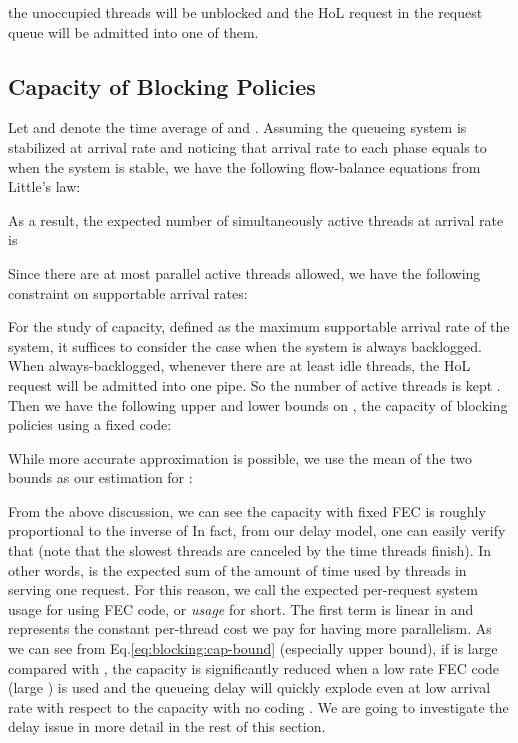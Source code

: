 \documentclass[journal]{IEEEtran}
\begin{document}
the unoccupied threads will be unblocked and the HoL request in the request queue will be admitted into one of them.


  

\subsection{Capacity of Blocking Policies}
\label{ssec:capBlocking}
Let  and  denote the time average of   and . 
Assuming the queueing system is stabilized at arrival rate  and noticing that arrival rate to each phase equals to  when the system is stable, we have the following flow-balance equations from Little's law:

As a result, the expected number of simultaneously active threads at arrival rate  is

Since there are at most  parallel active threads allowed, we have the following constraint on supportable arrival rates:


For the study of  capacity, 
defined as the maximum supportable arrival rate  of the system, it suffices to consider the case when the system is always backlogged. When always-backlogged, whenever there are at least  idle threads, the HoL request will be admitted into one pipe. So the number of active threads is kept . Then we have the following upper and lower bounds on , the capacity of blocking policies using a fixed  code:

While more accurate approximation is possible, we use the mean of  the two bounds as our estimation for :



From the above discussion, we can see the capacity with fixed FEC is roughly proportional to the inverse of  In fact, from our delay model, one can easily verify that  (note that the slowest  threads are canceled by the time  threads finish). In other words,  is the expected sum of the amount of time used by  threads in serving one request. For this reason, we call  the expected per-request system usage for using  FEC code, or {\em usage} for short. The first term is linear in  and represents the constant per-thread cost  we pay for having more parallelism. As we can see from Eq.\ref{eq:blocking:cap-bound} (especially upper bound), if  is large compared with , the capacity is significantly reduced when a low rate FEC code (large ) is used and the queueing delay will quickly explode even at low arrival rate with respect to the capacity with no coding . We are going to investigate the delay issue in more detail in the rest of this section.
\end{document}
